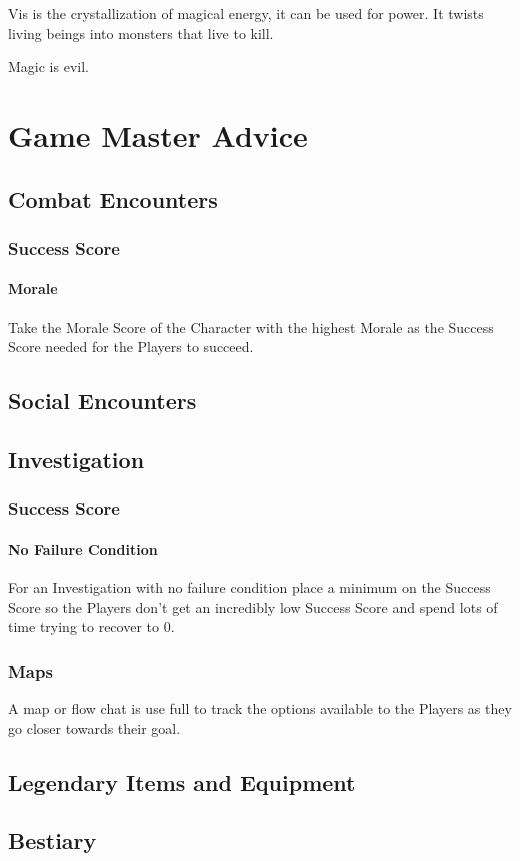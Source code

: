 \documentclass[a4paper,12pt,oneside]{book}
\begin{document}
        Vis is the crystallization of magical energy, it can be used for power. It twists living beings into monsters that live to kill.

        Magic is evil.

    \chapter{Game Master Advice}
        \section{Combat Encounters}
            \subsection{Success Score}
                \subsubsection{Morale}
                    Take the Morale Score of the Character with the highest Morale as the Success Score needed for the Players to succeed.
        \section{Social Encounters}

        \section{Investigation}
            \subsection{Success Score}
                \subsubsection{No Failure Condition}
                    For an Investigation with no failure condition place a minimum on the Success Score so the Players don't get an incredibly low Success Score and spend lots of time trying to recover to 0.

            \subsection{Maps}
                A map or flow chat is use full to track the options available to the Players as they go closer towards their goal.

        \section{Legendary Items and Equipment}
        \section{Bestiary}


    \appendix

    \backmatter
    {}
    
    \printindex
\end{document}
